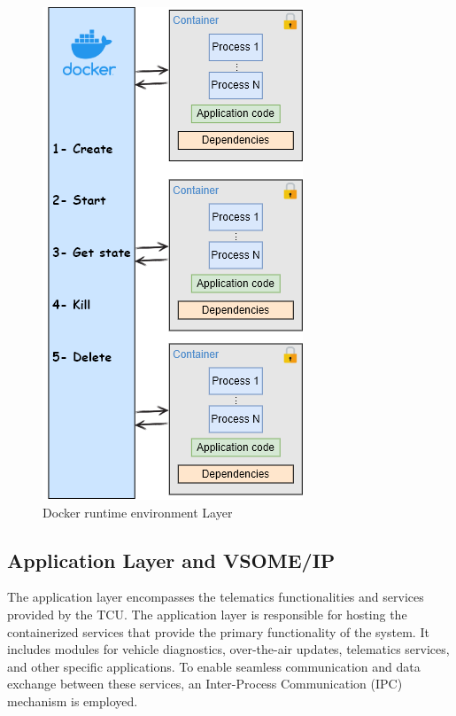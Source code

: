 \documentclass[
12pt,
oneside, 
onehalfspacing, 
nolistspacing, 
parskip, 
chapterinoneline, 
]{AASTCOMPUTER}
\begin{document}
\clearpage

\begin{figure}[h]
\centering
\includegraphics[scale=0.5]{Figures/5.png}
\caption[Docker runtime environment Layer]{Docker runtime environment Layer}
\label{fig:5}
\end{figure}

\subsection{Application Layer and VSOME/IP}
The application layer encompasses the telematics functionalities and services provided by the TCU. The application layer is responsible for hosting the containerized services that provide the primary functionality of the system. It includes modules for vehicle diagnostics, over-the-air updates, telematics services, and other specific applications. To enable seamless communication and data exchange between these services, an Inter-Process Communication (IPC) mechanism is employed.
\end{document}
